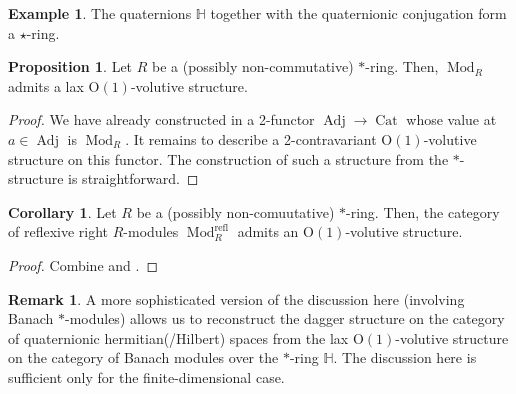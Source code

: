\documentclass{article}
\newcommand{\Cat}{\operatorname{Cat}}%
\newcommand{\Adj}{\operatorname{Adj}}%
\newcommand{\Mod}{\operatorname{Mod}}%
\newcommand{\refl}{\operatorname{refl}}%
\newcommand{\Oone}{\operatorname{O(1)}}
\numberwithin{equation}{section}
\theoremstyle{definition}
\newtheorem{example}[definition]{Example}
\newtheorem{proposition}[definition]{Proposition}
\newtheorem{remark}[definition]{Remark}
\newtheorem{corollary}[definition]{Corollary}
\theoremstyle{theorem}
\begin{document}
\begin{example}
    The quaternions $\mathbb{H}$ together with the quaternionic conjugation form a $\star$-ring. 
\end{example}
\begin{proposition}\label{Proposition: modules over star rings admits lax volutive structure}
    Let $R$ be a (possibly non-commutative) $*$-ring. Then, $\Mod_R$ admits a lax $\Oone$-volutive structure. 
\end{proposition}
\begin{proof}
    We have already constructed in  a 2-functor $\Adj \to \Cat$ 
    whose value at $a \in \Adj$ is $\Mod_R$. It remains to describe a 2-contravariant $\Oone$-volutive structure on this functor. The construction of such 
    a structure from the $*$-structure is straightforward. 
\end{proof}
\begin{corollary}
    Let $R$ be a (possibly non-comuutative) $*$-ring. Then, the category of reflexive right $R$-modules $\Mod_R^{\refl}$ admits an $\Oone$-volutive structure. 
\end{corollary}
\begin{proof}
    Combine  and . 
\end{proof}
\begin{remark}
    A more sophisticated version of the discussion here (involving Banach $*$-modules) allows us to reconstruct the dagger structure on the category 
    of quaternionic hermitian(/Hilbert) spaces from the lax $\Oone$-volutive structure on the category of Banach modules over the $*$-ring $\mathbb{H}$. 
    The discussion here is sufficient only for the finite-dimensional case. 
\end{remark}
\end{document}
